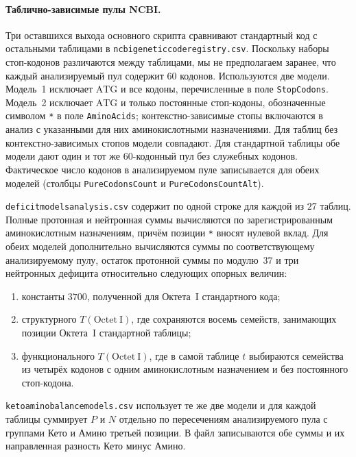 \documentclass[11pt,a4paper]{article}
\renewcommand{\_}{\origunderscore\allowbreak}
\begin{document}
\paragraph{Таблично-зависимые пулы NCBI.}
Три оставшихся выхода основного скрипта сравнивают стандартный код
с остальными таблицами в
\texttt{ncbi\_genetic\_code\_registry.csv}. Поскольку
наборы стоп-кодонов различаются между таблицами, мы не предполагаем
заранее, что каждый анализируемый пул содержит $60$ кодонов.
Используются две модели. Модель~1 исключает
$\mathrm{ATG}$ и все кодоны, перечисленные в поле
\texttt{Stop\_Codons}. Модель~2 исключает $\mathrm{ATG}$ и только
постоянные стоп-кодоны, обозначенные символом \texttt{*} в поле
\texttt{Amino\_Acids}; контекстно-зависимые стопы включаются в анализ
с указанными для них аминокислотными назначениями. Для таблиц без
контекстно-зависимых стопов модели совпадают. Для стандартной
таблицы обе модели дают один и тот же 60-кодонный пул без служебных
кодонов. Фактическое число кодонов в
анализируемом пуле записывается для обеих моделей (столбцы
\texttt{Pure\_Codons\_Count} и \texttt{Pure\_Codons\_Count\_Alt}).

\texttt{deficit\_models\_analysis.csv} содержит по одной строке для
каждой из $27$ таблиц. Полные протонная и нейтронная суммы вычисляются
по зарегистрированным аминокислотным
назначениям, причём позиции \texttt{*} вносят нулевой вклад. Для
обеих моделей дополнительно вычисляются суммы по
соответствующему анализируемому пулу, остаток протонной суммы по
модулю~$37$ и три нейтронных дефицита относительно следующих
опорных величин:
\begin{enumerate}
  \item константы $3700$, полученной для Октета~I стандартного кода;
  \item структурного $T(\mathrm{Octet~I})$, где сохраняются восемь
        семейств, занимающих позиции Октета~I стандартной таблицы;
  \item функционального $T(\mathrm{Octet~I})$, где в самой таблице
        $t$ выбираются семейства из четырёх кодонов с одним
        аминокислотным назначением и без постоянного стоп-кодона.
\end{enumerate}

\texttt{keto\_amino\_balance\_models.csv} использует те же две
модели и для каждой таблицы суммирует $P$ и $N$ отдельно по
пересечениям анализируемого пула с группами Кето и Амино третьей
позиции. В файл записываются обе суммы и их направленная разность
Кето минус Амино.
\end{document}

